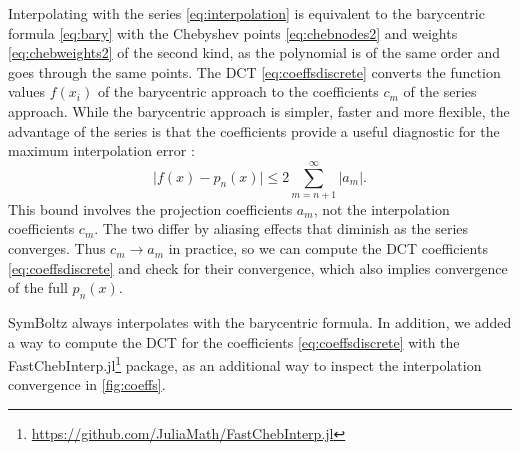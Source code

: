 \documentclass{aa}
\begin{document}
Interpolating with the series \eqref{eq:interpolation} is equivalent to the barycentric formula \eqref{eq:bary}
with the Chebyshev points \eqref{eq:chebnodes2} and weights \eqref{eq:chebweights2} of the second kind,
as the polynomial is of the same order and goes through the same points.
The DCT \eqref{eq:coeffsdiscrete} converts the function values $f(x_i)$ of the barycentric approach to the coefficients $c_m$ of the series approach.
While the barycentric approach is simpler, faster and more flexible,
the advantage of the series is that the coefficients
provide a useful diagnostic for the maximum interpolation error \citep[Chapter 4]{trefethenApproximationTheoryApproximation2019}:
\begin{equation}
	\big\lvert f(x) - p_n(x) \big\rvert \leq 2 \sum_{m=n+1}^\infty \lvert a_m \rvert .
\label{eq:coefferr}
\end{equation}
This bound involves the projection coefficients $a_m$, not the interpolation coefficients $c_m$.
The two differ by aliasing effects that diminish as the series converges.
Thus $c_m \rightarrow a_m$ in practice,
so we can compute the DCT coefficients \eqref{eq:coeffsdiscrete} and check for their convergence,
which also implies convergence of the full $p_n(x)$.

SymBoltz always interpolates with the barycentric formula.
In addition,
we added a way to compute the DCT for the coefficients \eqref{eq:coeffsdiscrete} with the FastChebInterp.jl\footnote{\url{https://github.com/JuliaMath/FastChebInterp.jl}} package,
as an additional way to inspect the interpolation convergence in \cref{fig:coeffs}.
\end{document}
